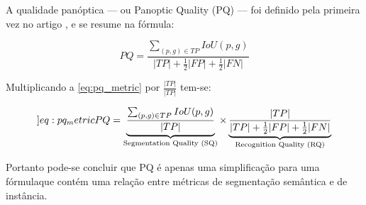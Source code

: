 
A qualidade panóptica — ou Panoptic Quality (PQ) — foi definido pela primeira vez no artigo , e se resume na fórmula:

\begin{equation}
\label{eq:pq_metric}
PQ = \frac{\sum_{(p,g)\in TP}IoU(p,g)}{ |TP| + \frac{1}{2}|FP| + \frac{1}{2}|FN|}
\end{equation}

Multiplicando a \cref{eq:pq_metric} por $\frac{|TP|}{|TP|}$ tem-se:

\begin{equation}
	\label[]{eq:pq_metric}
	PQ = \underbrace{\frac{\sum_{(p,g)\in TP}IoU(p,g)}{|TP|}}_{\text{Segmentation Quality (SQ)}} 
	\times
	\underbrace{\frac{|TP|}{|TP| + \frac{1}{2}|FP| + \frac{1}{2}|FN|}}_{\text{Recognition Quality (RQ)}}
\end{equation}

Portanto pode-se concluir que PQ é apenas uma simplificação para uma fórmulaque contém uma relação entre métricas de segmentação semântica e de instância.


